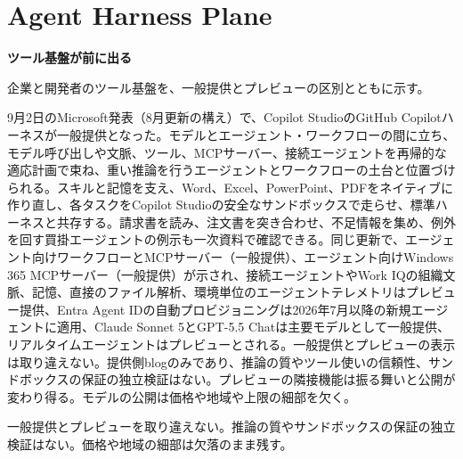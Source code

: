 \section{Agent Harness Plane}
\begin{wideflow}
{\Large\bfseries ツール基盤が前に出る}\par
\smallskip
{\color{SurveyMuted}企業と開発者のツール基盤を、一般提供とプレビューの区別とともに示す。}\par
\end{wideflow}

9月2日のMicrosoft発表（8月更新の構え）で、Copilot StudioのGitHub Copilotハーネスが一般提供となった\cite{copilotharness}。モデルとエージェント・ワークフローの間に立ち、モデル呼び出しや文脈、ツール、MCPサーバー、接続エージェントを再帰的な適応計画で束ね、重い推論を行うエージェントとワークフローの土台と位置づけられる。スキルと記憶を支え、Word、Excel、PowerPoint、PDFをネイティブに作り直し、各タスクをCopilot Studioの安全なサンドボックスで走らせ、標準ハーネスと共存する。請求書を読み、注文書を突き合わせ、不足情報を集め、例外を回す買掛エージェントの例示も一次資料で確認できる。同じ更新で、エージェント向けワークフローとMCPサーバー（一般提供）、エージェント向けWindows 365 MCPサーバー（一般提供）が示され、接続エージェントやWork IQの組織文脈、記憶、直接のファイル解析、環境単位のエージェントテレメトリはプレビュー提供、Entra Agent IDの自動プロビジョニングは2026年7月以降の新規エージェントに適用、Claude Sonnet 5とGPT-5.5 Chatは主要モデルとして一般提供、リアルタイムエージェントはプレビューとされる。一般提供とプレビューの表示は取り違えない。提供側blogのみであり、推論の質やツール使いの信頼性、サンドボックスの保証の独立検証はない。プレビューの隣接機能は振る舞いと公開が変わり得る。モデルの公開は価格や地域や上限の細部を欠く。

\begin{claimboundary}[提供とプレビューの境界]
一般提供とプレビューを取り違えない。推論の質やサンドボックスの保証の独立検証はない。価格や地域の細部は欠落のまま残す。
\end{claimboundary}

